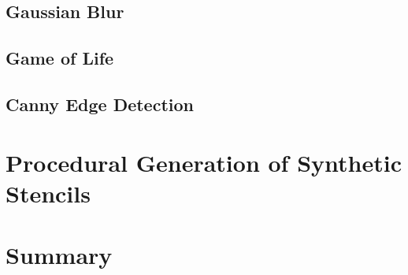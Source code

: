 \subsection{Gaussian Blur}

\subsection{Game of Life}

\subsection{Canny Edge Detection}


\section{Procedural Generation of Synthetic Stencils}


\section{Summary}
